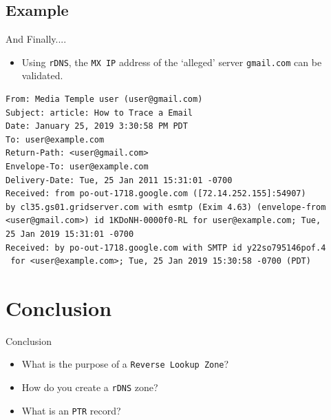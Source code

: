 \documentclass[xcolor=table,aspectratio=169]{beamer}
\begin{document}
\subsection{Example}
\begin{frame}[fragile]{And Finally....}
  \begin{itemize}
    \item Using \texttt{rDNS}, the \texttt{MX IP} address of the `alleged' server \texttt{gmail.com} can be validated. 
  \end{itemize}
  \begin{tcolorbox}
    \lstset{
      basicstyle=\tiny\ttfamily,
    }
    \begin{lstlisting}
From: Media Temple user (user@gmail.com)
Subject: article: How to Trace a Email
Date: January 25, 2019 3:30:58 PM PDT
To: user@example.com
Return-Path: <user@gmail.com>
Envelope-To: user@example.com
Delivery-Date: Tue, 25 Jan 2011 15:31:01 -0700
Received: from po-out-1718.google.com ([72.14.252.155]:54907) 
by cl35.gs01.gridserver.com with esmtp (Exim 4.63) (envelope-from 
<user@gmail.com>) id 1KDoNH-0000f0-RL for user@example.com; Tue, 
25 Jan 2019 15:31:01 -0700
Received: by po-out-1718.google.com with SMTP id y22so795146pof.4
 for <user@example.com>; Tue, 25 Jan 2019 15:30:58 -0700 (PDT)
    \end{lstlisting}
  \end{tcolorbox}
\end{frame}

\section*{Conclusion}
\begin{frame}{Conclusion}
  \begin{itemize}
    \item What is the purpose of a \texttt{Reverse Lookup Zone}?
    \item How do you create a \texttt{rDNS} zone?
    \item What is an \texttt{PTR} record?
  \end{itemize}
\end{frame}
\end{document}
